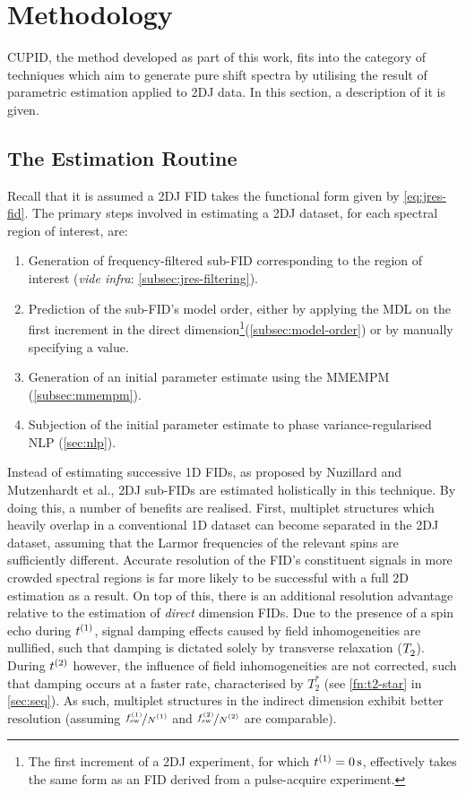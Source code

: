 \section{Methodology}
\ac{CUPID}, the method developed as part of this work, fits into the category
of techniques which aim to generate pure shift spectra by utilising the result of
parametric estimation applied to \ac{2DJ} data.
In this section, a description of it is given.

\subsection{The Estimation Routine}
Recall that it is assumed a \ac{2DJ} \ac{FID} takes the functional form given
by \cref{eq:jres-fid}. The primary steps involved in estimating a \ac{2DJ}
dataset, for each spectral region of interest, are:
\begin{enumerate}
    \item Generation of frequency-filtered sub-\ac{FID} corresponding to
        the region of interest (\textit{vide infra}:
        \cref{subsec:jres-filtering}).
    \item Prediction of the sub-\ac{FID}'s model order, either by applying the
        \ac{MDL} on the first increment in the direct dimension\footnote{
            The first increment of a \ac{2DJ} experiment, for which $t^{(1)} =
            \qty{0}{\second}$, effectively takes the same form as an \ac{FID}
            derived from a pulse-acquire experiment.
        }(\cref{subsec:model-order}) or
        by manually specifying a
        value.
    \item Generation of an initial parameter estimate using the \ac{MMEMPM}
        (\cref{subsec:mmempm}).
    \item Subjection of the initial parameter estimate to phase
        variance-regularised \ac{NLP} (\cref{sec:nlp}).
\end{enumerate}
Instead of estimating successive \ac{1D} \acp{FID}, as proposed by
Nuzillard and Mutzenhardt et al., \ac{2DJ} sub-\acp{FID} are estimated
holistically in this technique. By doing this, a number of benefits are
realised.
First, multiplet structures which heavily overlap in a
conventional \ac{1D} dataset can become separated in the \ac{2DJ} dataset,
assuming that the Larmor frequencies of the relevant spins are sufficiently
different.
Accurate resolution of the \ac{FID}'s constituent signals in more crowded spectral
regions is far more likely to be successful with a full \ac{2D} estimation as a
result.
On top of this, there is an additional resolution advantage relative to the
estimation of \emph{direct} dimension \acp{FID}. Due to the presence of a spin
echo during $t^{(1)}$, signal damping effects caused by field inhomogeneities are
nullified, such that damping is dictated solely by transverse relaxation
($T_2^{\vphantom{*}}$). During $t^{(2)}$ however, the influence of field inhomogeneities are not
corrected, such that damping occurs at a faster rate, characterised by $T_2^*$
(see \cref{fn:t2-star} in \cref{sec:seq}).
As such, multiplet structures in the indirect dimension exhibit better
resolution (assuming $\nicefrac{\fswone}{\None}$ and
$\nicefrac{\fswtwo}{\Ntwo}$ are comparable).

